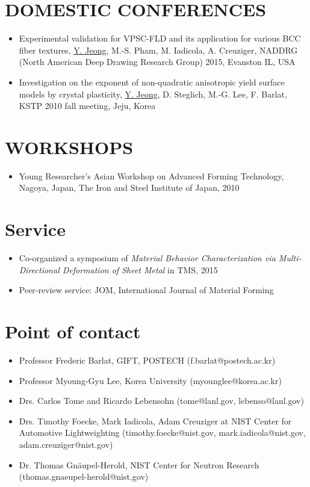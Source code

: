 \documentclass{res}
\begin{document}
\begin{resume}
  \section{DOMESTIC CONFERENCES}
  \begin{itemize}
  \item Experimental validation for VPSC-FLD and its application for various BCC fiber textures, \underline{Y. Jeong}, M.-S. Pham, M. Iadicola, A. Creuziger, NADDRG (North American Deep Drawing Research Group) 2015, Evanston IL, USA
  \item Investigation on the exponent of non-quadratic anisotropic yield surface models by crystal plasticity, \underline{Y. Jeong}, D. Steglich, M.-G. Lee, F. Barlat, KSTP 2010 fall meeting, Jeju, Korea
  \end{itemize}

  \section{WORKSHOPS}
  \begin{itemize}
  \item Young Researcher's Asian Workshop on Advanced Forming Technology, Nagoya, Japan, The Iron and Steel Institute of Japan, 2010
  \end{itemize}

  \section{Service}
  \begin{itemize}
  \item Co-organized a symposium of {\it Material Behavior Characterization via Multi-Directional Deformation of Sheet Metal } in TMS, 2015
  \item Peer-review service: JOM, International Journal of Material Forming
  \end{itemize}

  \section{Point of contact}
  \begin{itemize}
  \item Professor Frederic Barlat, GIFT, POSTECH (f.barlat@postech.ac.kr)
  \item Professor Myoung-Gyu Lee, Korea University (myounglee@korea.ac.kr)
  \item Drs. Carlos Tome and Ricardo Lebensohn (tome@lanl.gov, lebenso@lanl.gov)
  \item Drs. Timothy Foecke, Mark Iadicola, Adam Creuziger at NIST Center for Automotive Lightweighting (timothy.foecke@nist.gov, mark.iadicola@nist.gov, adam.creuziger@nist.gov)
  \item Dr. Thomas Gn\"aupel-Herold, NIST Center for Neutron Research (thomas.gnaeupel-herold@nist.gov)
  \end{itemize}

\end{resume}
\end{document}
